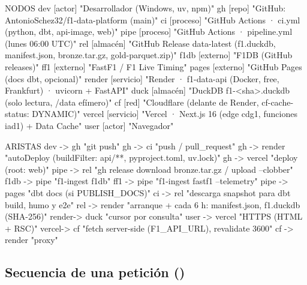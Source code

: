 \begin{codigo}
NODOS
  dev      [actor]      "Desarrollador (Windows, uv, npm)"
  gh       [repo]       "GitHub: AntonioSchez32/f1-data-platform (main)"
  ci       [proceso]    "GitHub Actions · ci.yml (python, dbt, api-image, web)"
  pipe     [proceso]    "GitHub Actions · pipeline.yml (lunes 06:00 UTC)"
  rel      [almacén]    "GitHub Release data-latest (f1.duckdb, manifest.json, bronze.tar.gz, gold-parquet.zip)"
  f1db     [externo]    "F1DB (GitHub releases)"
  ff1      [externo]    "FastF1 / F1 Live Timing"
  pages    [externo]    "GitHub Pages (docs dbt, opcional)"
  render   [servicio]   "Render · f1-data-api (Docker, free, Frankfurt) · uvicorn + FastAPI"
  duck     [almacén]    "DuckDB f1-<sha>.duckdb (solo lectura, /data efímero)"
  cf       [red]        "Cloudflare (delante de Render, cf-cache-status: DYNAMIC)"
  vercel   [servicio]   "Vercel · Next.js 16 (edge cdg1, funciones iad1) + Data Cache"
  user     [actor]      "Navegador"

ARISTAS
  dev   -> gh      "git push"
  gh    -> ci      "push / pull_request"
  gh    -> render  "autoDeploy (buildFilter: api/**, pyproject.toml, uv.lock)"
  gh    -> vercel  "deploy (root: web)"
  pipe  -> rel     "gh release download bronze.tar.gz / upload --clobber"
  f1db  -> pipe    "f1-ingest f1db"
  ff1   -> pipe    "f1-ingest fastf1 --telemetry"
  pipe  -> pages   "dbt docs (si PUBLISH_DOCS)"
  ci    -> rel     "descarga snapshot para dbt build, humo y e2e"
  rel   -> render  "arranque + cada 6 h: manifest.json, f1.duckdb (SHA-256)"
  render-> duck    "cursor por consulta"
  user  -> vercel  "HTTPS (HTML + RSC)"
  vercel-> cf      "fetch server-side (F1_API_URL), revalidate 3600"
  cf    -> render  "proxy"
\end{codigo}

\subsection{Secuencia de una petición ()}

